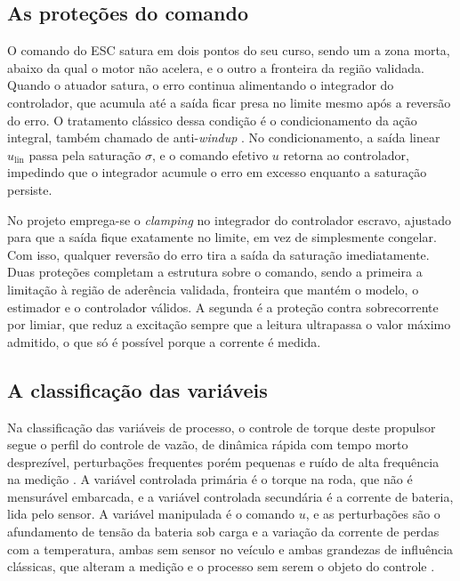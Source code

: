 \subsection{As proteções do comando}
\label{sec:protecoes}

O comando do ESC satura em dois pontos do seu curso, sendo um a zona morta, abaixo da qual o
motor não acelera, e o outro a fronteira da região validada. Quando o atuador satura, o erro
continua alimentando o integrador do controlador, que acumula até a saída ficar presa
no limite mesmo após a reversão do erro. O tratamento clássico dessa condição é o
condicionamento da ação integral, também chamado de anti-\emph{windup}
\cite{raffo_tcpi_pid2}. No condicionamento,
a saída linear $u_{\mathrm{lin}}$ passa pela saturação $\sigma$, e
o comando efetivo $u$ retorna ao controlador, impedindo que o
integrador acumule o
erro em excesso enquanto a saturação persiste.

No projeto emprega-se o \emph{clamping} no integrador do controlador escravo, ajustado
para que a saída fique exatamente no limite, em vez de simplesmente congelar. Com isso, qualquer reversão do erro tira a saída da saturação imediatamente. Duas
proteções completam a estrutura sobre o comando, sendo a primeira a limitação à região de aderência
validada, fronteira que mantém o modelo, o estimador e o controlador válidos.
A segunda é a proteção contra sobrecorrente por limiar, que reduz a excitação sempre que a
leitura ultrapassa o valor máximo admitido, o que só é possível porque a corrente é medida.

\subsection{A classificação das variáveis}
\label{sec:variaveis}

Na classificação das variáveis de processo, o controle de torque deste propulsor segue o
perfil do controle de vazão, de dinâmica rápida com tempo morto desprezível, perturbações
frequentes porém pequenas e ruído de alta frequência na medição
\cite{raffo_tcpi_variaveis}. A variável controlada primária é o torque na roda, que não é
mensurável embarcada, e a variável controlada secundária é a corrente de bateria, lida pelo
sensor. A variável manipulada é o comando $u$, e as perturbações são o afundamento de
tensão da bateria sob carga e a variação da corrente de perdas com a temperatura, ambas
sem sensor no veículo e ambas grandezas de influência clássicas, que alteram a medição e o
processo sem serem o objeto do controle \cite{braga_instr_config}.

